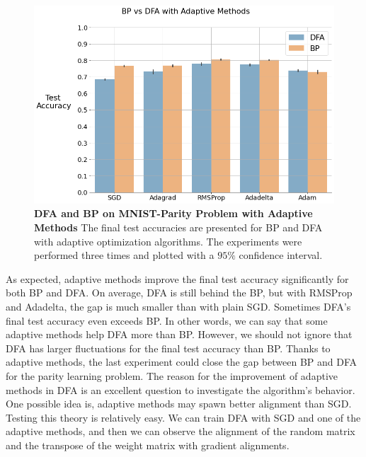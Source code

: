 \documentclass[a4paper, nobind]{templates/ociamthesis}
\begin{document}
\begin{figure}

{\centering \includegraphics[width=1\linewidth]{figures/3_mainExperiment} 

}

\caption[DFA and BP on MNIST-Parity Problem with Adaptive Methods]{\textbf{DFA and BP on MNIST-Parity Problem with Adaptive Methods} \newline The final test accuracies are presented for BP and DFA with adaptive optimization algorithms. The experiments were performed three times and plotted with a $95\%$ confidence interval.}\label{fig:mainExperiment}
\end{figure}

\noindent As expected, adaptive methods improve the final test accuracy significantly for both BP and DFA. On average, DFA is still behind the BP, but with RMSProp and Adadelta, the gap is much smaller than with plain SGD. Sometimes DFA's final test accuracy even exceeds BP. In other words, we can say that some adaptive methods help DFA more than BP. However, we should not ignore that DFA has larger fluctuations for the final test accuracy than BP. Thanks to adaptive methods, the last experiment could close the gap between BP and DFA for the parity learning problem.
\noindent The reason for the improvement of adaptive methods in DFA is an excellent question to investigate the algorithm's behavior. One possible idea is, adaptive methods may spawn better alignment than SGD. Testing this theory is relatively easy. We can train DFA with SGD and one of the adaptive methods, and then we can observe the alignment of the random matrix and the transpose of the weight matrix with gradient alignments.
\end{document}
